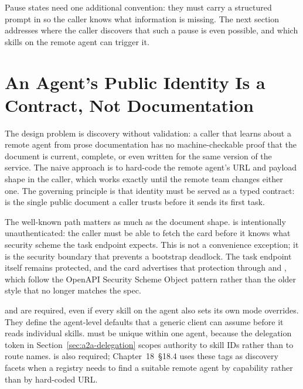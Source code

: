 Pause states need one additional convention: they must carry a structured
prompt in  so the caller knows what information is
missing. The next section addresses where the caller discovers that such a
pause is even possible, and which skills on the remote agent can trigger
it.


\section{An Agent's Public Identity Is a Contract, Not Documentation}
\label{sec:a2a-agent-card}

The design problem is discovery without validation: a caller that learns
about a remote agent from prose documentation has no machine-checkable
proof that the document is current, complete, or even written for the same
version of the service. The naive approach is to hard-code the remote
agent's URL and payload shape in the caller, which works exactly until the
remote team changes either one. The governing principle is that identity
must be served as a typed contract:  is the single public
document a caller trusts before it sends its first task.

The well-known path matters as much as the document shape.
 is intentionally unauthenticated: the
caller must be able to fetch the card before it knows what security scheme
the task endpoint expects. This is not a convenience exception; it is the
security boundary that prevents a bootstrap deadlock. The task endpoint
itself remains protected, and the card advertises that protection through
 and , which follow the OpenAPI
Security Scheme Object pattern rather than the older
 style that no longer matches the spec.

 and  are required, even
if every skill on the agent also sets its own mode overrides. They define
the agent-level defaults that a generic client can assume before it reads
individual skills.  must be unique within one agent,
because the delegation token in Section~\ref{sec:a2a-delegation} scopes
authority to skill IDs rather than to route names. 
is also required; Chapter~18~\S18.4 uses these tags as discovery facets
when a registry needs to find a suitable remote agent by capability rather
than by hard-coded URL.

